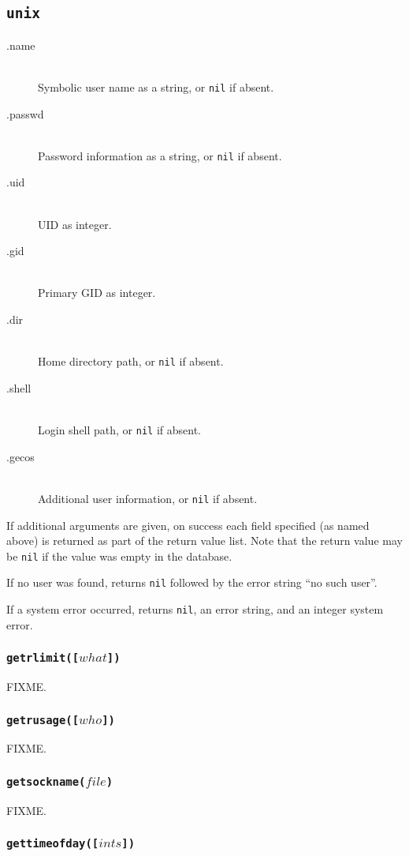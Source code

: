 \documentclass[11pt, oneside]{memoir}
\newcommand*{\nil}[0]{\texttt{nil}\xspace}
\newcommand*{\fn}[1]{\texttt{#1}\xspace}
\newcounter{toccols}
\newenvironment{Module}[1]{
	\subsection{\texttt{#1}}
	\addtocontents{toc}{
		\protect\begin{multicols}{\value{toccols}}
	}
}{
	\addtocontents{toc}{\protect\end{multicols}}
}
\begin{document}
\begin{Module}{unix}
\begin{description}
\item[.name] \hfill \\
Symbolic user name as a string, or \nil if absent.
\item[.passwd] \hfill \\
Password information as a string, or \nil if absent.
\item[.uid] \hfill \\
UID as integer.
\item[.gid] \hfill \\
Primary GID as integer.
\item[.dir] \hfill \\
Home directory path, or \nil if absent.
\item[.shell] \hfill \\
Login shell path, or \nil if absent.
\item[.gecos] \hfill \\
Additional user information, or \nil if absent.
\end{description}

If additional arguments are given, on success each field specified (as named above) is returned as part of the return value list. Note that the return value may be \nil if the value was empty in the database.

If no user was found, returns \nil followed by the error string ``no such user''.

If a system error occurred, returns \nil, an error string, and an integer system error.

\subsubsection[\fn{getrlimit}]{\fn{getrlimit([$what$])}}

FIXME.

\subsubsection[\fn{getrusage}]{\fn{getrusage([$who$])}}

FIXME.

\subsubsection[\fn{getsockname}]{\fn{getsockname($file$)}}

FIXME.

\subsubsection[\fn{gettimeofday}]{\fn{gettimeofday([$ints$])}}


\end{Module}
\end{document}
